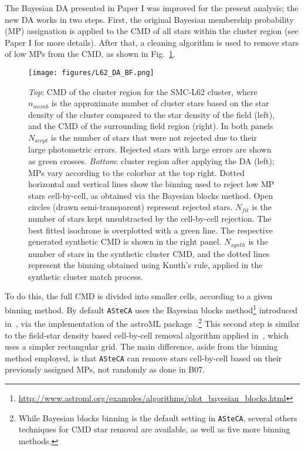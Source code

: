 \documentclass[draft]{aa}
\begin{document}
The Bayesian DA presented in Paper I was improved for the present analysis; the
new DA works in two steps. First, the original Bayesian membership probability 
(MP) assignation is applied to the CMD of all stars within the cluster region 
(see Paper I for more details).\@
%
After that, a cleaning algorithm is used to remove stars of low MPs from the
CMD, as shown in Fig.~\ref{fig:DA_BF}.
%
\begin{figure}
\centering
\texttt{[image: figures/L62\_DA\_BF.png]}
\caption{\emph{Top}: CMD of the cluster region for the SMC-L62 cluster, where
$n_{memb}$ is the approximate number of cluster stars based on the star density
of the cluster compared to the star density of the field (left), and the CMD of
the surrounding field region (right).
In both panels $N_{accpt}$ is the number of stars that were not rejected due to
their large photometric errors. Rejected stars with large errors are shown as
green crosses.
%
\emph{Bottom}: cluster region after applying the DA (left); MPs vary
according to the colorbar at the top right. Dotted horizontal and vertical lines
show the binning used to reject low MP stars cell-by-cell, as obtained via the
Bayesian blocks method. Open circles (drawn semi-transparent) represent rejected
stars.
$N_{fit}$ is the number of stars kept unsubtracted by the cell-by-cell
rejection. The best fitted isochrone is overplotted with a green line. 
The respective generated synthetic CMD is shown in the right panel. $N_{synth}$
is the number of stars in the synthetic cluster CMD, and the dotted lines
represent the binning obtained using Knuth's rule, applied in the synthetic
cluster match process.}
\label{fig:DA_BF}
\end{figure}
%
To do this, the full CMD is divided into smaller cells, according to a
given binning method. By default \texttt{ASteCA} uses the Bayesian blocks
method\footnote{\url{http://www.astroml.org/examples/algorithms/plot_bayesian_blocks.html}}
introduced in~\cite{Scargle_2013}, via the implementation of the astroML
package~\citep{Vanderplas_2012}.\footnote{While Bayesian blocks binning is the
default setting in \texttt{ASteCA}, several others techniques for CMD star
removal are available, as well as five more binning methods.}
This second step is similar to the field-star density based cell-by-cell removal
algorithm applied in~\citet[][B07]{Bonatto_2007}, which uses a simpler
rectangular grid.
%
The main difference, aside from the binning method employed, is that
\texttt{ASteCA} can remove stars cell-by-cell based on their previously assigned
MPs, not randomly as done in B07.
\end{document}
